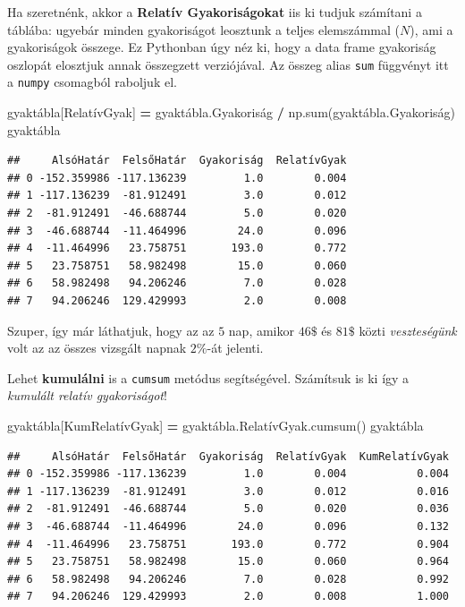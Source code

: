 \documentclass[
]{book}
\newenvironment{Shaded}{\begin{snugshade}}{\end{snugshade}}
\newcommand{\BuiltInTok}[1]{#1}
\newcommand{\NormalTok}[1]{#1}
\newcommand{\OperatorTok}[1]{\textcolor[rgb]{0.81,0.36,0.00}{\textbf{#1}}}
\newcommand{\StringTok}[1]{\textcolor[rgb]{0.31,0.60,0.02}{#1}}
\begin{document}
Ha szeretnénk, akkor a \textbf{Relatív Gyakoriságokat} iis ki tudjuk számítani a táblába: ugyebár minden gyakoriságot leosztunk a teljes elemszámmal (\(N\)), ami a gyakoriságok összege. Ez Pythonban úgy néz ki, hogy a data frame gyakoriság oszlopát elosztjuk annak összegzett verziójával. Az összeg alias \texttt{sum} függvényt itt a \texttt{numpy} csomagból raboljuk el.

\begin{Shaded}
\begin{Highlighting}[]
\NormalTok{gyaktábla[}\StringTok{\textquotesingle{}RelatívGyak\textquotesingle{}}\NormalTok{] }\OperatorTok{=}\NormalTok{ gyaktábla.Gyakoriság }\OperatorTok{/}\NormalTok{ np.}\BuiltInTok{sum}\NormalTok{(gyaktábla.Gyakoriság)}
\NormalTok{gyaktábla}
\end{Highlighting}
\end{Shaded}

\begin{verbatim}
##     AlsóHatár  FelsőHatár  Gyakoriság  RelatívGyak
## 0 -152.359986 -117.136239         1.0        0.004
## 1 -117.136239  -81.912491         3.0        0.012
## 2  -81.912491  -46.688744         5.0        0.020
## 3  -46.688744  -11.464996        24.0        0.096
## 4  -11.464996   23.758751       193.0        0.772
## 5   23.758751   58.982498        15.0        0.060
## 6   58.982498   94.206246         7.0        0.028
## 7   94.206246  129.429993         2.0        0.008
\end{verbatim}

Szuper, így már láthatjuk, hogy az az \(5\) nap, amikor \(46\$\) és \(81\$\) közti \emph{veszteségünk} volt az az összes vizsgált napnak \(2\%\)-át jelenti.

Lehet \textbf{kumulálni} is a \texttt{cumsum} metódus segítségével. Számítsuk is ki így a \emph{kumulált relatív gyakoriságot}!

\begin{Shaded}
\begin{Highlighting}[]
\NormalTok{gyaktábla[}\StringTok{\textquotesingle{}KumRelatívGyak\textquotesingle{}}\NormalTok{] }\OperatorTok{=}\NormalTok{ gyaktábla.RelatívGyak.cumsum()}
\NormalTok{gyaktábla}
\end{Highlighting}
\end{Shaded}

\begin{verbatim}
##     AlsóHatár  FelsőHatár  Gyakoriság  RelatívGyak  KumRelatívGyak
## 0 -152.359986 -117.136239         1.0        0.004           0.004
## 1 -117.136239  -81.912491         3.0        0.012           0.016
## 2  -81.912491  -46.688744         5.0        0.020           0.036
## 3  -46.688744  -11.464996        24.0        0.096           0.132
## 4  -11.464996   23.758751       193.0        0.772           0.904
## 5   23.758751   58.982498        15.0        0.060           0.964
## 6   58.982498   94.206246         7.0        0.028           0.992
## 7   94.206246  129.429993         2.0        0.008           1.000
\end{verbatim}
\end{document}
